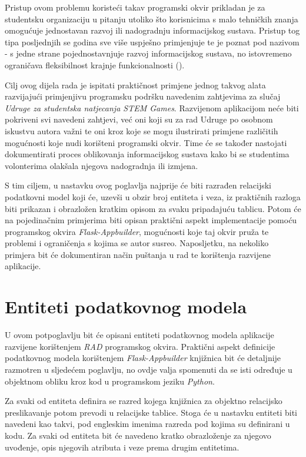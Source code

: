 \documentclass[times, utf8, diplomski]{fer}
\begin{document}
Pristup ovom problemu koristeći takav programski okvir prikladan je za
studentsku organizaciju u pitanju utoliko što korisnicima s malo tehničkih
znanja omogućuje jednostavan razvoj ili nadogradnju informacijskog sustava.
Pristup tog tipa posljednjih se godina sve više uspješno primjenjuje te je poznat pod
nazivom  - s jedne strane pojednostavnjuje razvoj informacijskog
sustava, no istovremeno ograničava fleksibilnost krajnje funkcionalnosti
(\cite{low-code}).

Cilj ovog dijela rada je ispitati praktičnost primjene jednog takvog alata
razvijajući primjenjivu programsku podršku navedenim zahtjevima za slučaj
\emph{Udruge za studentska natjecanja STEM Games}. Razvijenom aplikacijom neće
biti pokriveni svi navedeni zahtjevi, već oni koji su za rad Udruge po osobnom
iskustvu autora važni te oni kroz koje se mogu ilustrirati primjene različitih
mogućnosti koje nudi korišteni programski okvir. Time će se također nastojati
dokumentirati proces oblikovanja informacijskog sustava kako bi se studentima
volonterima olakšala njegova nadogradnja ili izmjena.

S tim ciljem, u nastavku ovog poglavlja najprije će biti razrađen relacijski
podatkovni model koji će, uzevši u obzir broj entiteta i veza, iz praktičnih
razloga biti prikazan i obrazložen kratkim opisom za svaku pripadajuću tablicu.
Potom će na pojedinačnim primjerima biti opisan praktični aspekt implementacije
pomoću programskog okvira \emph{Flask-Appbuilder}, mogućnosti koje taj okvir
pruža te problemi i ograničenja s kojima se autor susreo. Naposljetku, na
nekoliko primjera bit će dokumentiran način puštanja u rad te korištenja
razvijene aplikacije.

\section{Entiteti podatkovnog modela} \label{model}

U ovom potpoglavlju bit će opisani entiteti podatkovnog modela aplikacije
razvijene korištenjem \emph{RAD} programskog okvira. Praktični aspekt definicije
podatkovnog modela korištenjem \emph{Flask-Appbuilder} knjižnica bit će
detaljnije razmotren u sljedećem poglavlju, no ovdje valja spomenuti da se
isti određuje u objektnom obliku kroz kod u programskom jeziku \emph{Python}.

Za svaki od entiteta definira se razred kojega knjižnica za objektno relacijsko
preslikavanje  potom prevodi u relacijske tablice. Stoga će u nastavku
entiteti biti navedeni kao takvi, pod engleskim imenima razreda pod kojima su
definirani u kodu. Za svaki od entiteta bit će navedeno kratko obrazloženje za
njegovo uvođenje, opis njegovih atributa i veze prema drugim entitetima.
\end{document}

